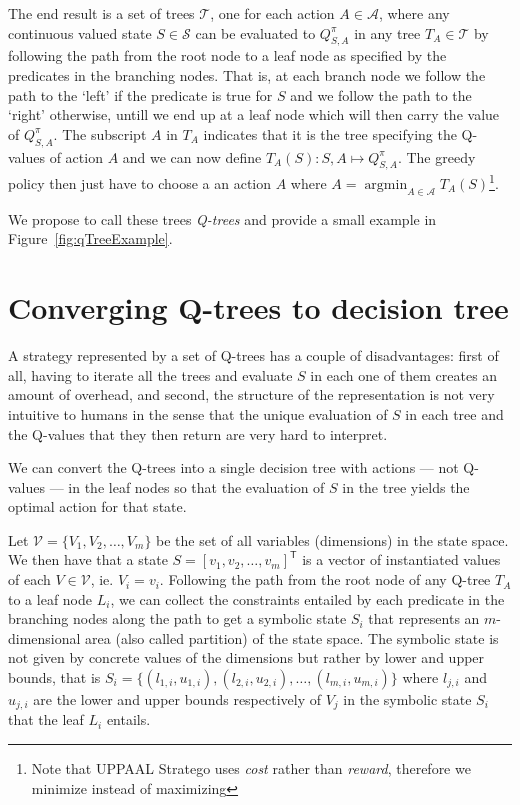 \documentclass{article}
\DeclareMathOperator*{\argmin}{argmin}
\DeclareMathOperator*{\tran}{\mathsf{T}}
\begin{document}
The end result is a set of trees $\mathcal{T}$, one for each action $A \in
\mathcal{A}$, where any continuous valued state $S \in \mathcal{S}$ can be
evaluated to $Q^{\pi}_{S,A}$ in
any tree $T_A \in \mathcal{T}$ by following the path from the root node to a
leaf node as specified by the predicates in the branching nodes. That is, at
each branch node we follow the path to the `left' if the predicate is true for
$S$ and we follow the path to the `right' otherwise, untill we end up at a leaf
node which will then carry the value of $Q^{\pi}_{S,A}$. The subscript $A$ in
$T_A$ indicates that it is the tree specifying the Q-values of action $A$ and we
can now define $T_A(S): S, A \mapsto Q^{\pi}_{S,A}$. The greedy policy then just
have to choose a an action $A$ where $A = \argmin_{A \in \mathcal{A}}
T_A(S)$\footnote{Note that UPPAAL Stratego uses \textit{cost} rather than
\textit{reward}, therefore we minimize instead of maximizing}.

We propose to call these trees \textit{Q-trees} and provide a small example in
Figure~\ref{fig:qTreeExample}.



\section{Converging Q-trees to decision tree}%
\label{sec:convergeToDT}

A strategy represented by a set of Q-trees has a couple of disadvantages: first
of all, having to iterate all the trees and evaluate $S$ in each one of them
creates an amount of overhead, and second, the structure of
the representation is not very intuitive to humans in the sense that the unique
evaluation of $S$ in each tree and the Q-values that they then return are very
hard to interpret.

We can convert the Q-trees into a single decision tree with actions --- not
Q-values --- in the leaf nodes so that the evaluation of $S$ in the tree yields
the optimal action for that state.

Let $\mathcal{V} = \{ V_1, V_2, \ldots, V_m \}$ be the set of all variables
(dimensions) in the state space. We then have that a state $S = {[v_1, v_2,
\ldots, v_m]}^{\tran}$ is a vector of instantiated values of each $V \in
\mathcal{V}$, ie. $V_i = v_i$. Following the path from the root node of any
Q-tree $T_A$ to a leaf node $L_i$, we can collect the constraints entailed by
each predicate in the branching nodes along the path to get a symbolic state
$S_i$ that represents an $m$-dimensional area (also called partition) of the
state space. The symbolic state is not given by concrete values of the
dimensions but rather by lower and upper bounds, that is $S_i = \{ (l_{1,i},
u_{1,i}), (l_{2,i}, u_{2,i}), \ldots, (l_{m,i}, u_{m,i}) \}$ where $l_{j,i}$ and
$u_{j,i}$ are the lower and upper bounds respectively of $V_j$ in the symbolic
state $S_i$ that the leaf $L_i$ entails.
\end{document}
